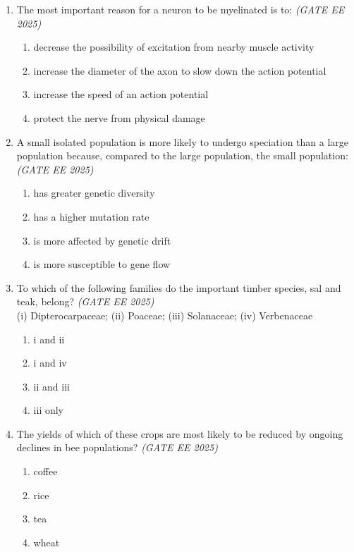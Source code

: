 \begin{enumerate}[leftmargin=*,label=\textbf{Q.\arabic*},resume]

\item The most important reason for a neuron to be myelinated is to: \hfill \textit{(GATE EE 2025)}
\begin{multicols}{2}
\begin{enumerate}[label=(\Alph*)]
\item decrease the possibility of excitation from nearby muscle activity
\item increase the diameter of the axon to slow down the action potential
\item increase the speed of an action potential
\item protect the nerve from physical damage
\end{enumerate}
\end{multicols}


\item A small isolated population is more likely to undergo speciation than a large population because, compared to the large population, the small population: \hfill \textit{(GATE EE 2025)}
\begin{multicols}{2}
\begin{enumerate}[label=(\Alph*)]
\item has greater genetic diversity
\item has a higher mutation rate
\item is more affected by genetic drift
\item is more susceptible to gene flow
\end{enumerate}
\end{multicols}


\item To which of the following families do the important timber species, sal and teak, belong? \hfill \textit{(GATE EE 2025)} \\
(i) Dipterocarpaceae; (ii) Poaceae; (iii) Solanaceae; (iv) Verbenaceae
\begin{multicols}{2}
\begin{enumerate}[label=(\Alph*)]
\item i and ii
\item i and iv
\item ii and iii
\item iii only
\end{enumerate}
\end{multicols}


\item The yields of which of these crops are most likely to be reduced by ongoing declines in bee populations? \hfill \textit{(GATE EE 2025)}
\begin{multicols}{2}
\begin{enumerate}[label=(\Alph*)]
\item coffee
\item rice
\item tea
\item wheat
\end{enumerate}
\end{multicols}



\end{enumerate}
